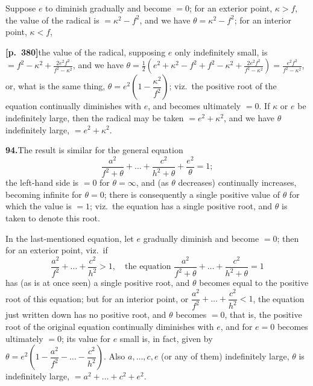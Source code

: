 \documentclass[11pt]{article}
\begin{document}
Suppose $e$ to diminish gradually and become $=0$; for an exterior point, $\kappa>f$, the value of the radical is $=\kappa^{2}-f^{2}$, and we have $\theta=\kappa^{2}-f^{2}$; for an interior point, $\kappa<f$,

\bigskip

\noindent\textbf{[p.~380]}\quad the value of the radical, supposing $e$ only indefinitely small, is $\displaystyle =f^{2}-\kappa^{2}+\frac{2e^{2}f^{2}}{f^{2}-\kappa^{2}}$, and we have $\displaystyle \theta=\tfrac{1}{2}\!\left(e^{2}+\kappa^{2}-f^{2}+f^{2}-\kappa^{2}+\frac{2e^{2}f^{2}}{f^{2}-\kappa^{2}}\right) = \frac{e^{2}f^{2}}{f^{2}-\kappa^{2}}$, or, what is the same thing, $\theta = e^{2}\!\left(1-\dfrac{\kappa^{2}}{f^{2}}\right)$; viz.\ the positive root of the equation continually diminishes with $e$, and becomes ultimately $=0$. If $\kappa$ or $e$ be indefinitely large, then the radical may be taken $=e^{2}+\kappa^{2}$, and we have $\theta$ indefinitely large, $=e^{2}+\kappa^{2}$.

\bigskip

\noindent\textbf{94.}\quad The result is similar for the general equation
\[
\frac{a^{2}}{f^{2}+\theta} + \ldots + \frac{c^{2}}{h^{2}+\theta} + \frac{e^{2}}{\theta} = 1;
\]
the left-hand side is $=0$ for $\theta=\infty$, and (as $\theta$ decreases) continually increases, becoming infinite for $\theta=0$; there is consequently a single positive value of $\theta$ for which the value is $=1$; viz.\ the equation has a single positive root, and $\theta$ is taken to denote this root.

In the last-mentioned equation, let $e$ gradually diminish and become $=0$; then for an exterior point, viz.\ if
\[
\frac{a^{2}}{f^{2}} + \ldots + \frac{c^{2}}{h^{2}} > 1,\quad\text{the equation } \frac{a^{2}}{f^{2}+\theta} + \ldots + \frac{c^{2}}{h^{2}+\theta} = 1
\]
has (as is at once seen) a single positive root, and $\theta$ becomes equal to the positive root of this equation; but for an interior point, or $\dfrac{a^{2}}{f^{2}} + \ldots + \dfrac{c^{2}}{h^{2}} < 1$, the equation just written down has no positive root, and $\theta$ becomes $=0$, that is, the positive root of the original equation continually diminishes with $e$, and for $e=0$ becomes ultimately $=0$; its value for $e$ small is, in fact, given by $\theta = e^{2}\!\left(1-\dfrac{a^{2}}{f^{2}}-\ldots-\dfrac{c^{2}}{h^{2}}\right)$. Also $a,\ldots,c,e$ (or any of them) indefinitely large, $\theta$ is indefinitely large, $=a^{2}+\ldots+c^{2}+e^{2}$.

\bigskip
\end{document}
